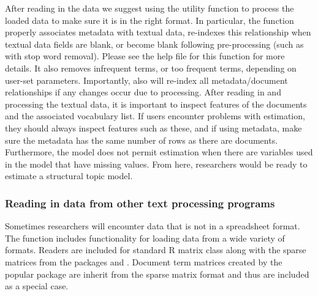 \documentclass[nojss]{jss}
\begin{document}
\begin{Schunk}
\end{Schunk}

After reading in the data we suggest using the utility function  to process the loaded data to make sure it is in the right format. In particular, the  function properly associates metadata with textual data, re-indexes this relationship when textual data fields are blank, or become blank following pre-processing (such as with stop word removal). Please see the help file for this function for more details. It also removes infrequent terms, or too frequent terms, depending on user-set parameters. Importantly,  also will re-index all metadata/document relationships if any changes occur due to processing. After reading in and processing the textual data, it is important to inspect features of the documents and the associated vocabulary list. If users encounter problems with estimation, they should always inspect features such as these, and if using metadata, make sure the metadata has the same number of rows as there are documents. Furthermore, the model does not permit estimation when there are variables used in the model that have missing values. From here, researchers would be ready to estimate a structural topic model.

\subsubsection{Reading in data from other text processing programs}

Sometimes researchers will encounter data that is not in a spreadsheet format. The  function includes functionality for loading data from a wide variety of formats.  Readers are included for standard R matrix class along with the sparse matrices from the packages  and .  Document term matrices created by the popular package  are inherit from the  sparse matrix format and thus are included as a special case.
\end{document}
